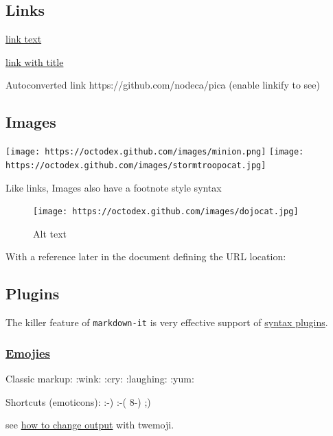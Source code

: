 \documentclass[
  paper=a4,
  ,captions=tableheading
]{scrartcl}
\renewenvironment{quote}{\begin{customblockquote}\list{}{\rightmargin=0em\leftmargin=0em}%
\item\relax\color{blockquote-text}\ignorespaces}{\unskip\unskip\endlist\end{customblockquote}}
\begin{document}
\hypertarget{links}{%
\subsection{Links}\label{links}}

\href{http://dev.nodeca.com}{link text}

\href{http://nodeca.github.io/pica/demo/}{link with title}

Autoconverted link https://github.com/nodeca/pica (enable linkify to
see)

\hypertarget{images}{%
\subsection{Images}\label{images}}

\texttt{[image: https://octodex.github.com/images/minion.png]}
\texttt{[image: https://octodex.github.com/images/stormtroopocat.jpg]}

Like links, Images also have a footnote style syntax

\begin{figure}
\centering
\texttt{[image: https://octodex.github.com/images/dojocat.jpg]}
\caption{Alt text}
\end{figure}

With a reference later in the document defining the URL location:

\hypertarget{plugins}{%
\subsection{Plugins}\label{plugins}}

The killer feature of
\colorbox{inlinecode-bgcolor}{\lstinline{markdown-it}} is very effective
support of
\href{https://www.npmjs.org/browse/keyword/markdown-it-plugin}{syntax
plugins}.

\hypertarget{emojies}{%
\subsubsection{\texorpdfstring{\href{https://github.com/markdown-it/markdown-it-emoji}{Emojies}}{Emojies}}\label{emojies}}

\begin{quote}
Classic markup: :wink: :cry: :laughing: :yum:

Shortcuts (emoticons): :-) :-( 8-) ;)
\end{quote}

see
\href{https://github.com/markdown-it/markdown-it-emoji\#change-output}{how
to change output} with twemoji.
\end{document}
